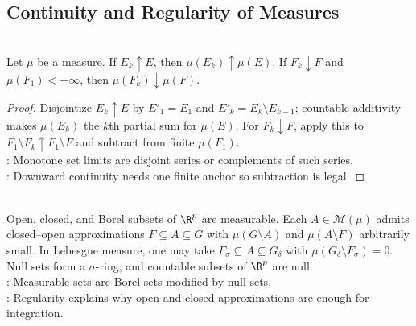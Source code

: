 \subsection{Continuity and Regularity of Measures}

\begin{corollary} \label{cor:measure-continuity-up-down} \\
Let $\mu$ be a measure. If $E_k\uparrow E$, then $\mu(E_k)\uparrow\mu(E)$. If $F_k\downarrow F$ and $\mu(F_1)<+\infty$, then $\mu(F_k)\downarrow\mu(F)$.
\begin{proof}
Disjointize $E_k\uparrow E$ by $E'_1=E_1$ and $E'_k=E_k\setminus E_{k-1}$; countable additivity makes $\mu(E_k)$ the $k$th partial sum for $\mu(E)$. For $F_k\downarrow F$, apply this to $F_1\setminus F_k\uparrow F_1\setminus F$ and subtract from finite $\mu(F_1)$.\\
: Monotone set limits are disjoint series or complements of such series.\\
: Downward continuity needs one finite anchor so subtraction is legal.
\end{proof}
\end{corollary}

\begin{remark} \label{rem:borel-null-regular-measurable-sets} \\
Open, closed, and Borel subsets of $\R^p$ are measurable. Each $A\in\mathcal{M}(\mu)$ admits closed--open approximations $F\subseteq A\subseteq G$ with $\mu(G\setminus A)$ and $\mu(A\setminus F)$ arbitrarily small. In Lebesgue measure, one may take $F_\sigma\subseteq A\subseteq G_\delta$ with $\mu(G_\delta\setminus F_\sigma)=0$. Null sets form a $\sigma$-ring, and countable subsets of $\R^p$ are null.\\
: Measurable sets are Borel sets modified by null sets.\\
: Regularity explains why open and closed approximations are enough for integration.
\end{remark}

